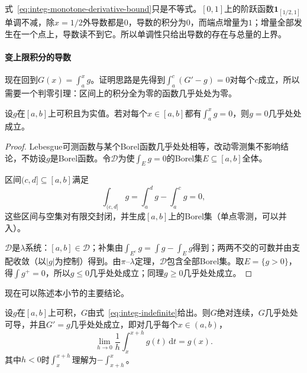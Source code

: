 式~\eqref{eq:integ-monotone-derivative-bound}只是不等式。$[0,1]$上的阶跃函数$\mathbf 1_{[1/2,1]}$单调不减，除$x=1/2$外导数都是$0$，导数的积分为$0$，而端点增量为$1$；增量全部发生在一个点上，导数读不到它。所以单调性只给出导数的存在与总量的上界。

\paragraph{变上限积分的导数}
现在回到$G(x)=\int_a^xg$。证明思路是先得到$\int_a^c(G'-g)=0$对每个$c$成立，所以需要一个判零引理：区间上的积分全为零的函数几乎处处为零。

\begin{lemma}[区间积分全为零的函数]
\label{lem:integ-vanishing-intervals}
设$g$在$[a,b]$上可积且为实值。若对每个$x\in[a,b]$都有$\int_a^xg=0$，则$g=0$几乎处处成立。
\end{lemma}

\begin{proof}
Lebesgue可测函数与某个Borel函数几乎处处相等，改动零测集不影响结论，不妨设$g$是Borel函数。令$\mathcal D$为使$\int_Eg=0$的Borel集$E\subseteq[a,b]$全体。

区间$(c,d]\subseteq[a,b]$满足
\[
 \int_{(c,d]}g=\int_a^dg-\int_a^cg=0,
\]
这些区间与空集对有限交封闭，并生成$[a,b]$上的Borel集（单点零测，可以并入）。

$\mathcal D$是$\lambda$系统：$[a,b]\in\mathcal D$；补集由$\int_{E^c}g=\int g-\int_Eg$得到；两两不交的可数并由支配收敛（以$\lvert g\rvert$为控制）得到。由$\pi$--$\lambda$定理，$\mathcal D$包含全部Borel集。取$E=\{g>0\}$，得$\int g^+=0$，所以$g\leq0$几乎处处成立；同理$g\geq0$几乎处处成立。
\end{proof}

现在可以陈述本小节的主要结论。

\begin{theorem}[Lebesgue微分定理]
\label{thm:integ-lebesgue-differentiation}
设$g$在$[a,b]$上可积，$G$由式~\eqref{eq:integ-indefinite}给出。则$G$绝对连续，$G$几乎处处可导，并且$G'=g$几乎处处成立，即对几乎每个$x\in(a,b)$，
\begin{equation}
 \lim_{h\to0}\frac1h\int_x^{x+h}g(t)\,\mathrm dt=g(x).
 \label{eq:integ-lebesgue-differentiation}
\end{equation}
其中$h<0$时$\int_x^{x+h}$理解为$-\int_{x+h}^x$。
\end{theorem}

